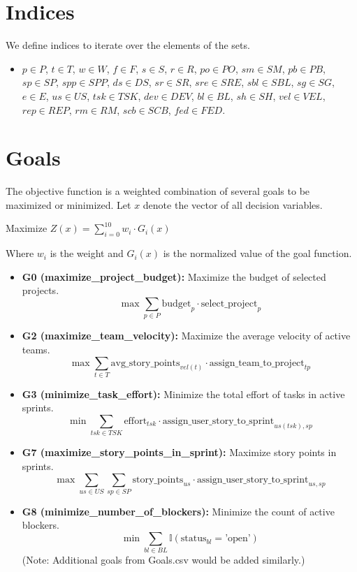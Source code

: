 \documentclass{article}
\begin{document}
\section{Indices}
We define indices to iterate over the elements of the sets.
\begin{itemize}
    \item $p \in P$, $t \in T$, $w \in W$, $f \in F$, $s \in S$, $r \in R$, $po \in PO$, $sm \in SM$, $pb \in PB$, $sp \in SP$, $spp \in SPP$, $ds \in DS$, $sr \in SR$, $sre \in SRE$, $sbl \in SBL$, $sg \in SG$, $e \in E$, $us \in US$, $tsk \in TSK$, $dev \in DEV$, $bl \in BL$, $sh \in SH$, $vel \in VEL$, $rep \in REP$, $rm \in RM$, $scb \in SCB$, $fed \in FED$.
\end{itemize}

\section{Goals}
The objective function is a weighted combination of several goals to be maximized or minimized. Let $x$ denote the vector of all decision variables.
\begin{center}
    Maximize $Z(x) = \sum_{i=0}^{10} w_i \cdot G_i(x)$
\end{center}
Where $w_i$ is the weight and $G_i(x)$ is the normalized value of the goal function.
\begin{itemize}
    \item \textbf{G0 (maximize\_project\_budget):} Maximize the budget of selected projects.
    $$ \max \sum_{p \in P} \text{budget}_p \cdot \text{select\_project}_p $$
    \item \textbf{G2 (maximize\_team\_velocity):} Maximize the average velocity of active teams.
    $$ \max \sum_{t \in T} \text{avg\_story\_points}_{vel(t)} \cdot \text{assign\_team\_to\_project}_{tp} $$
    \item \textbf{G3 (minimize\_task\_effort):} Minimize the total effort of tasks in active sprints.
    $$ \min \sum_{tsk \in TSK} \text{effort}_{tsk} \cdot \text{assign\_user\_story\_to\_sprint}_{us(tsk), sp} $$
    \item \textbf{G7 (maximize\_story\_points\_in\_sprint):} Maximize story points in sprints.
    $$ \max \sum_{us \in US} \sum_{sp \in SP} \text{story\_points}_{us} \cdot \text{assign\_user\_story\_to\_sprint}_{us, sp} $$
    \item \textbf{G8 (minimize\_number\_of\_blockers):} Minimize the count of active blockers.
    $$ \min \sum_{bl \in BL} \mathbb{I}(\text{status}_{bl} = \text{'open'}) $$
    (Note: Additional goals from Goals.csv would be added similarly.)
\end{itemize}
\end{document}
